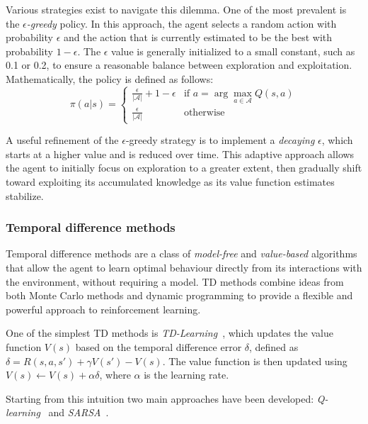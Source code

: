 Various strategies exist to navigate this dilemma. 
 One of the most prevalent is the \emph{$\epsilon$-greedy} policy. 
 In this approach, the agent selects a random action with probability \(\epsilon\) and 
 the action that is currently estimated to be the best with probability \(1 - \epsilon\). 
%
The \(\epsilon\) value is generally initialized to a small constant, such as 0.1 or 0.2, 
 to ensure a reasonable balance between exploration and exploitation. 
 Mathematically, the policy is defined as follows:
\begin{equation}
\pi(a|s) = \begin{cases}
\frac{\epsilon}{|\mathcal{A}|} + 1 - \epsilon & \text{if } a = \arg \max_{a \in \mathcal{A}} Q(s, a) \\
\frac{\epsilon}{|\mathcal{A}|} & \text{otherwise}
\end{cases}
\end{equation}

A useful refinement of the \(\epsilon\)-greedy strategy is to implement a \emph{decaying} \(\epsilon\), 
 which starts at a higher value and is reduced over time. This adaptive approach allows the agent to initially focus on exploration to a greater extent, 
 then gradually shift toward exploiting its accumulated knowledge as its value function estimates stabilize.

\subsubsection{Temporal difference methods}
Temporal difference methods are a class of \emph{model-free} and \emph{value-based} algorithms 
 that allow the agent to learn optimal behaviour directly from its interactions with the environment, without requiring a model. 
 TD methods combine ideas from both Monte Carlo methods and dynamic programming to provide a flexible and powerful approach to reinforcement learning.

One of the simplest TD methods is \emph{TD-Learning}~\cite{DBLP:journals/ml/Sutton88}, 
 which updates the value function \(V(s)\) based on the temporal difference error \(\delta\), 
 defined as \( \delta = R(s, a, s') + \gamma V(s') - V(s) \). 
 The value function is then updated using \( V(s) \leftarrow V(s) + \alpha \delta \), where \(\alpha\) is the learning rate.

Starting from this intuition two main approaches have been developed: 
 \emph{Q-learning}~\cite{DBLP:journals/ml/WatkinsD92} and \emph{SARSA}~\cite{10.5555/3312046}. 

